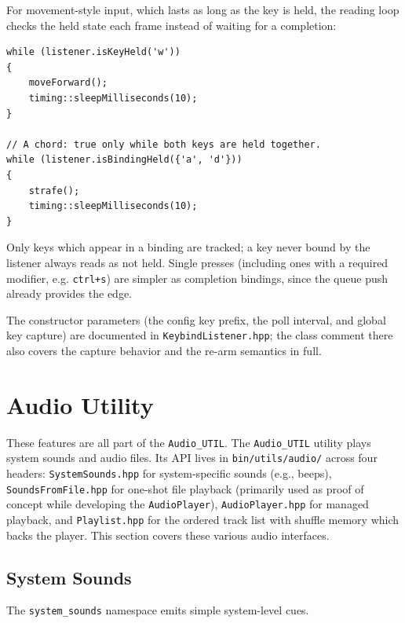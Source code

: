 For movement-style input, which lasts as long as the key is held, the reading loop checks the held state each frame instead of waiting for a completion:
\begin{lstlisting}[style=cppstyle]
while (listener.isKeyHeld('w'))
{
    moveForward();
    timing::sleepMilliseconds(10);
}

// A chord: true only while both keys are held together.
while (listener.isBindingHeld({'a', 'd'}))
{
    strafe();
    timing::sleepMilliseconds(10);
}
\end{lstlisting}
Only keys which appear in a binding are tracked; a key never bound by the listener always reads as not held. Single presses (including ones with a required modifier, e.g. \texttt{ctrl+s}) are simpler as completion bindings, since the queue push already provides the edge.

The constructor parameters (the config key prefix, the poll interval, and global key capture) are documented in \texttt{KeybindListener.hpp}; the class comment there also covers the capture behavior and the re-arm semantics in full.
















\section{Audio Utility}\label{section:audio}

These features are all part of the \texttt{Audio\_UTIL}. The \texttt{Audio\_UTIL} utility plays system sounds and audio files. Its API lives in \texttt{bin/utils/audio/} across four headers: \texttt{SystemSounds.hpp} for system-specific sounds (e.g., beeps), \texttt{SoundsFromFile.hpp} for one-shot file playback (primarily used as proof of concept while developing the \texttt{AudioPlayer}), \texttt{AudioPlayer.hpp} for managed playback, and \texttt{Playlist.hpp} for the ordered track list with shuffle memory which backs the player. This section covers these various audio interfaces.

\subsection{System Sounds}

The \texttt{system\_sounds} namespace emits simple system-level cues. 

